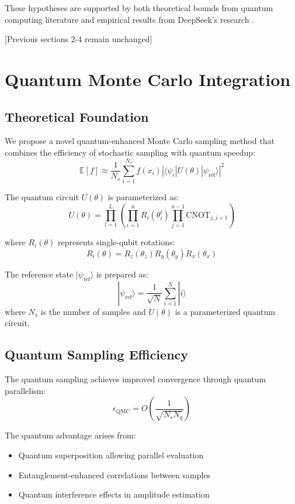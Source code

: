 \documentclass{article}
\begin{document}
These hypotheses are supported by both theoretical bounds from quantum computing literature \cite{Preskill2018quantumcomputingin, Bharti2022nobsapproach} and empirical results from DeepSeek's research \cite{DeepSeek2024}.

[Previous sections 2-4 remain unchanged]

\section{Quantum Monte Carlo Integration}
\subsection{Theoretical Foundation}
We propose a novel quantum-enhanced Monte Carlo sampling method that combines the efficiency of stochastic sampling with quantum speedup:
\begin{equation}
\mathbb{E}[f] \approx \frac{1}{N_s} \sum_{i=1}^{N_s} f(x_i) |\langle \psi_i|U(\theta)|\psi_{\text{ref}}\rangle|^2
\end{equation}

The quantum circuit $U(\theta)$ is parameterized as:
\begin{equation}
U(\theta) = \prod_{l=1}^L \left(\prod_{i=1}^n R_i(\theta_i^l) \prod_{j=1}^{n-1} \text{CNOT}_{j,j+1}\right)
\end{equation}

where $R_i(\theta)$ represents single-qubit rotations:
\begin{equation}
R_i(\theta) = R_z(\theta_z)R_y(\theta_y)R_x(\theta_x)
\end{equation}

The reference state $|\psi_{\text{ref}}\rangle$ is prepared as:
\begin{equation}
|\psi_{\text{ref}}\rangle = \frac{1}{\sqrt{N}} \sum_{i=1}^N |i\rangle
\end{equation}
where $N_s$ is the number of samples and $U(\theta)$ is a parameterized quantum circuit.

\subsection{Quantum Sampling Efficiency}
The quantum sampling achieves improved convergence through quantum parallelism:
\begin{equation}
\epsilon_{\text{QMC}} = O\left(\frac{1}{\sqrt{N_s N_q}}\right)
\end{equation}

The quantum advantage arises from:
\begin{itemize}
\item Quantum superposition allowing parallel evaluation
\item Entanglement-enhanced correlations between samples
\item Quantum interference effects in amplitude estimation
\end{itemize}
\end{document}
